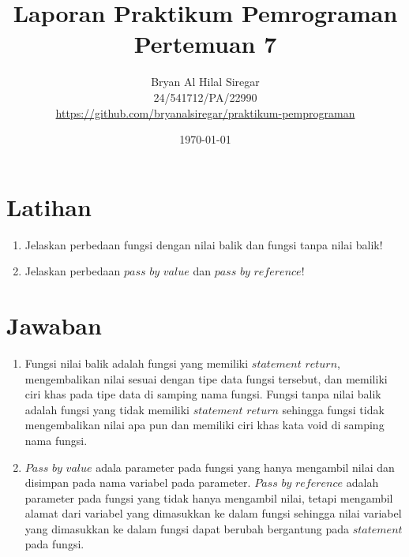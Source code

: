 \documentclass{article}
\title{Laporan Praktikum Pemrograman\\Pertemuan 7}
\author{Bryan Al Hilal Siregar\\ 24/541712/PA/22990\\ \href{https://github.com/bryanalsiregar/praktikum-pemprograman}{https://github.com/bryanalsiregar/praktikum-pemprograman}}
\date{\today}
\begin{document}
\maketitle

\section{Latihan}
\begin{enumerate}
    \item Jelaskan perbedaan fungsi dengan nilai balik dan fungsi tanpa nilai balik!
    \item Jelaskan perbedaan $pass$ $by$ $value$ dan $pass$ $by$ $reference$!
\end{enumerate}

\section{Jawaban}
\begin{enumerate}
    \item Fungsi nilai balik adalah fungsi yang memiliki $statement$ $return$, mengembalikan nilai sesuai dengan tipe data fungsi tersebut, dan memiliki ciri khas pada tipe data di samping nama fungsi. Fungsi tanpa nilai balik adalah fungsi yang tidak memiliki $statement$ $return$ sehingga fungsi tidak mengembalikan nilai apa pun dan memiliki ciri khas kata void di samping nama fungsi.
    \item $Pass$ $by$ $value$ adala parameter pada fungsi yang hanya mengambil nilai dan disimpan pada nama variabel pada parameter. $Pass$ $by$ $reference$ adalah parameter pada fungsi yang tidak hanya mengambil nilai, tetapi mengambil alamat dari variabel yang dimasukkan ke dalam fungsi sehingga nilai variabel yang dimasukkan ke dalam fungsi dapat berubah bergantung pada $statement$ pada fungsi. 
\end{enumerate}
\end{document}
